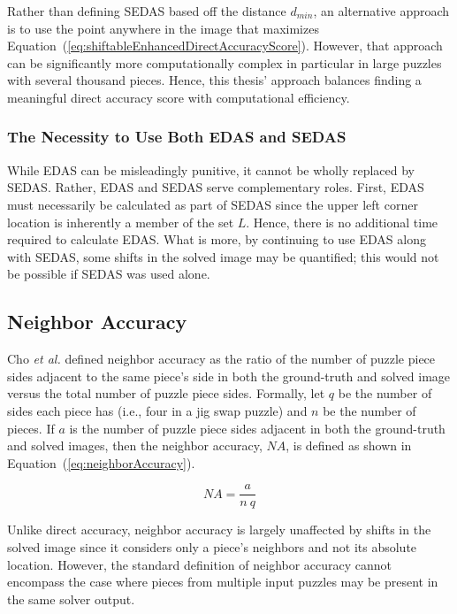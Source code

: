 \documentclass{report}
\def\eref#1{(\ref{#1})}
\begin{document}
Rather than defining SEDAS based off the distance $d_{min}$, an alternative approach is to use the point anywhere in the image that maximizes Equation~\eref{eq:shiftableEnhancedDirectAccuracyScore}.  However, that approach can be significantly more computationally complex in particular in large puzzles with several thousand pieces.  Hence, this thesis' approach balances finding a meaningful direct accuracy score with computational efficiency.

\subsubsection{The Necessity to Use Both EDAS and SEDAS}\label{sec:importanceEdasSedas}

While EDAS can be misleadingly punitive, it cannot be wholly replaced by SEDAS.  Rather, EDAS and SEDAS serve complementary roles.  First, EDAS must necessarily be calculated as part of SEDAS since the upper left corner location is inherently a member of the set $L$.  Hence, there is no additional time required to calculate EDAS.  What is more, by continuing to use EDAS along with SEDAS, some shifts in the solved image may be quantified; this would not be possible if SEDAS was used alone.

\subsection{Neighbor Accuracy}\label{sec:neighborAccuracy}

Cho \textit{et al.} \cite{cho2010} defined neighbor accuracy as the ratio of the number of puzzle piece sides adjacent to the same piece's side in both the ground-truth and solved image versus the total number of puzzle piece sides.  Formally, let $q$ be the number of sides each piece has (i.e., four in a jig swap puzzle) and $n$ be the number of pieces.  If $a$ is the number of puzzle piece sides adjacent in both the ground-truth and solved images, then the neighbor accuracy, $NA$, is defined as shown in Equation~\eref{eq:neighborAccuracy}.

\begin{equation} \label{eq:neighborAccuracy}
NA = \frac{a}{n~q}
\end{equation}

Unlike direct accuracy, neighbor accuracy is largely unaffected by shifts in the solved image since it considers only a piece's neighbors and not its absolute location.  However, the standard definition of neighbor accuracy cannot encompass the case where pieces from multiple input puzzles may be present in the same solver output.  
\end{document}
